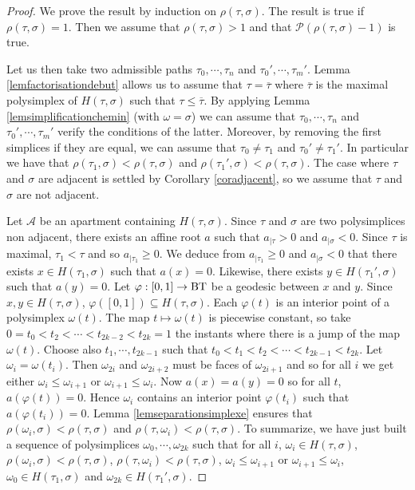 \documentclass[a4paper,10pt]{amsart}
\begin{document}
\begin{proof}
We prove the result by induction on $\rho(\tau,\sigma)$. The result is true if $\rho(\tau,\sigma)=1$. Then we assume that $\rho(\tau,\sigma)>1$ and that $\mathcal{P}(\rho(\tau,\sigma)-1)$ is true.

\bigskip

Let us then take two admissible paths $\tau_{0},\cdots,\tau_{n}$ and $\tau_{0}',\cdots,\tau_{m}'$. Lemma \ref{lemfactorisationdebut} allows us to assume that $\tau = \overline{\tau}$ where $\overline{\tau}$ is the maximal polysimplex of $H(\tau,\sigma)$ such that $\tau \leq \overline{\tau}$. By applying Lemma \ref{lemsimplificationchemin} (with $\omega=\sigma$) we can assume that $\tau_{0},\cdots,\tau_{n}$ and $\tau_{0}',\cdots,\tau_{m}'$ verify the conditions of the latter. Moreover, by removing the first simplices if they are equal, we can assume that $\tau_{0} \neq \tau_{1}$ and $\tau_{0}' \neq \tau_{1}'$. In particular we have that $\rho(\tau_{1},\sigma)<\rho(\tau,\sigma)$ and $\rho(\tau_{1}',\sigma)<\rho(\tau,\sigma)$. The case where $\tau$ and $\sigma$ are adjacent is settled by Corollary \ref{coradjacent}, so we assume that $\tau$ and $\sigma$ are not adjacent.

\bigskip

Let $\mathcal{A}$ be an apartment containing $H(\tau,\sigma)$. Since $\tau$ and $\sigma$ are two polysimplices non adjacent, there exists an affine root $a$ such that $a_{|\tau}>0$ and $a_{|\sigma}<0$. Since $\tau$ is maximal, $\tau_{1}<\tau$ and so $a_{|\tau_{1}}\geq 0$. We deduce from $a_{|\tau_{1}}\geq 0$ and $a_{|\sigma}< 0$ that there exists $x \in H(\tau_{1},\sigma)$ such that $a(x)=0$. Likewise, there exists $y \in H(\tau_{1}',\sigma)$ such that $a(y)=0$. Let $\varphi:[0,1] \rightarrow \bt$ be a geodesic between $x$ and $y$. Since $x,y \in H(\tau,\sigma)$, $\varphi([0,1]) \subseteq H(\tau,\sigma)$. Each $\varphi(t)$ is an interior point of a polysimplex $\omega(t)$. The map $t \mapsto \omega(t)$ is piecewise constant, so take $0=t_{0}<t_{2}<\cdots<t_{2k-2}<t_{2k}=1$ the instants where there is a jump of the map $\omega(t)$. Choose also $t_{1},\cdots,t_{2k-1}$ such that $t_{0} < t_{1} < t_{2} < \cdots < t_{2k-1} < t_{2k}$. Let $\omega_{i}=\omega(t_{i})$. Then $\omega_{2i}$ and $\omega_{2i+2}$ must be faces of $\omega_{2i+1}$ and so for all $i$ we get either $\omega_{i} \leq \omega_{i+1}$ or $\omega_{i+1} \leq \omega_{i}$. Now $a(x)=a(y)=0$ so for all $t$, $a(\varphi(t))=0$. Hence $\omega_{i}$ contains an interior point $\varphi(t_{i})$ such that $a(\varphi(t_{i}))=0$. Lemma \ref{lemseparationsimplexe} ensures that $\rho(\omega_{i},\sigma) < \rho(\tau,\sigma)$ and $\rho(\tau,\omega_{i})<\rho(\tau,\sigma)$. To summarize, we have just built a sequence of polysimplices $\omega_{0},\cdots,\omega_{2k}$ such that for all $i$, $\omega_{i} \in H(\tau,\sigma)$, $\rho(\omega_{i},\sigma) < \rho(\tau,\sigma)$, $\rho(\tau,\omega_{i})<\rho(\tau,\sigma)$, $\omega_{i} \leq \omega_{i+1}$ or $\omega_{i+1} \leq \omega_{i}$, $\omega_{0} \in H(\tau_{1},\sigma)$ and $\omega_{2k} \in H(\tau_{1}',\sigma)$.


\end{proof}
\end{document}
